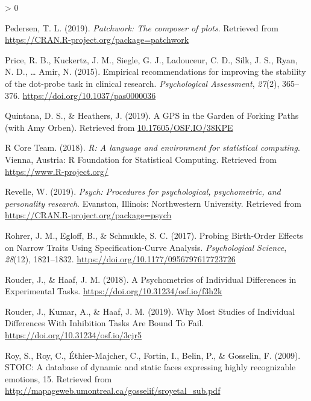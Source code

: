 \documentclass[
  english,
  man,floatsintext]{apa6}
\newlength{\cslhangindent}
\newenvironment{CSLReferences}[2] %
 {%
  \setlength{\parindent}{0pt}
  \ifodd #1 \everypar{\setlength{\hangindent}{\cslhangindent}}\ignorespaces\fi
  \ifnum #2 > 0
  \setlength{\parskip}{#2\baselineskip}
  \fi
 }%
 {}
\begin{document}
\begin{CSLReferences}{1}{0}
\leavevmode\hypertarget{ref-R-patchwork}{}%
Pedersen, T. L. (2019). \emph{Patchwork: The composer of plots}. Retrieved from \url{https://CRAN.R-project.org/package=patchwork}

\leavevmode\hypertarget{ref-price_empirical_2015}{}%
Price, R. B., Kuckertz, J. M., Siegle, G. J., Ladouceur, C. D., Silk, J. S., Ryan, N. D., \ldots{} Amir, N. (2015). Empirical recommendations for improving the stability of the dot-probe task in clinical research. \emph{Psychological Assessment}, \emph{27}(2), 365--376. \url{https://doi.org/10.1037/pas0000036}

\leavevmode\hypertarget{ref-quintana_gps_2019}{}%
Quintana, D. S., \& Heathers, J. (2019). A {GPS} in the {Garden} of {Forking} {Paths} (with {Amy} {Orben}). Retrieved from \href{https://10.17605/OSF.IO/38KPE}{10.17605/OSF.IO/38KPE}

\leavevmode\hypertarget{ref-R-base}{}%
R Core Team. (2018). \emph{R: A language and environment for statistical computing}. Vienna, Austria: R Foundation for Statistical Computing. Retrieved from \url{https://www.R-project.org/}

\leavevmode\hypertarget{ref-R-psych}{}%
Revelle, W. (2019). \emph{Psych: Procedures for psychological, psychometric, and personality research}. Evanston, Illinois: Northwestern University. Retrieved from \url{https://CRAN.R-project.org/package=psych}

\leavevmode\hypertarget{ref-rohrer_probing_2017}{}%
Rohrer, J. M., Egloff, B., \& Schmukle, S. C. (2017). Probing {Birth}-{Order} {Effects} on {Narrow} {Traits} {Using} {Specification}-{Curve} {Analysis}. \emph{Psychological Science}, \emph{28}(12), 1821--1832. \url{https://doi.org/10.1177/0956797617723726}

\leavevmode\hypertarget{ref-rouder_psychometrics_2018}{}%
Rouder, J., \& Haaf, J. M. (2018). A {Psychometrics} of {Individual} {Differences} in {Experimental} {Tasks}. \url{https://doi.org/10.31234/osf.io/f3h2k}

\leavevmode\hypertarget{ref-rouder_why_2019}{}%
Rouder, J., Kumar, A., \& Haaf, J. M. (2019). Why {Most} {Studies} of {Individual} {Differences} {With} {Inhibition} {Tasks} {Are} {Bound} {To} {Fail}. \url{https://doi.org/10.31234/osf.io/3cjr5}

\leavevmode\hypertarget{ref-roy_stoic:_2009}{}%
Roy, S., Roy, C., Éthier-Majcher, C., Fortin, I., Belin, P., \& Gosselin, F. (2009). {STOIC}: {A} database of dynamic and static faces expressing highly recognizable emotions, 15. Retrieved from \url{http://mapageweb.umontreal.ca/gosselif/sroyetal_sub.pdf}


\end{CSLReferences}
\end{document}
